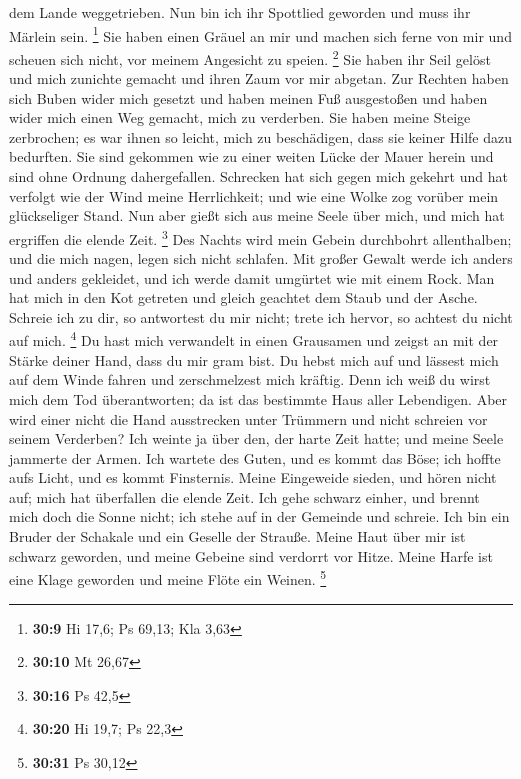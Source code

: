 dem Lande weggetrieben.  Nun bin ich ihr Spottlied
geworden und muss ihr Märlein sein. \footnote{\textbf{30:9} Hi 17,6; Ps
  69,13; Kla 3,63}  Sie haben einen Gräuel an mir und
machen sich ferne von mir und scheuen sich nicht, vor meinem Angesicht
zu speien. \footnote{\textbf{30:10} Mt 26,67}  Sie haben
ihr Seil gelöst und mich zunichte gemacht und ihren Zaum vor mir
abgetan.  Zur Rechten haben sich Buben wider mich gesetzt
und haben meinen Fuß ausgestoßen und haben wider mich einen Weg gemacht,
mich zu verderben.  Sie haben meine Steige zerbrochen; es
war ihnen so leicht, mich zu beschädigen, dass sie keiner Hilfe dazu
bedurften.  Sie sind gekommen wie zu einer weiten Lücke
der Mauer herein und sind ohne Ordnung dahergefallen. 
Schrecken hat sich gegen mich gekehrt und hat verfolgt wie der Wind
meine Herrlichkeit; und wie eine Wolke zog vorüber mein glückseliger
Stand.  Nun aber gießt sich aus meine Seele über mich,
und mich hat ergriffen die elende Zeit. \footnote{\textbf{30:16} Ps 42,5}
 Des Nachts wird mein Gebein durchbohrt allenthalben; und
die mich nagen, legen sich nicht schlafen.  Mit großer
Gewalt werde ich anders und anders gekleidet, und ich werde damit
umgürtet wie mit einem Rock.  Man hat mich in den Kot
getreten und gleich geachtet dem Staub und der Asche. 
Schreie ich zu dir, so antwortest du mir nicht; trete ich hervor, so
achtest du nicht auf mich. \footnote{\textbf{30:20} Hi 19,7; Ps 22,3}
 Du hast mich verwandelt in einen Grausamen und zeigst an
mit der Stärke deiner Hand, dass du mir gram bist.  Du
hebst mich auf und lässest mich auf dem Winde fahren und zerschmelzest
mich kräftig.  Denn ich weiß du wirst mich dem Tod
überantworten; da ist das bestimmte Haus aller Lebendigen.
 Aber wird einer nicht die Hand ausstrecken unter
Trümmern und nicht schreien vor seinem Verderben?  Ich
weinte ja über den, der harte Zeit hatte; und meine Seele jammerte der
Armen.  Ich wartete des Guten, und es kommt das Böse; ich
hoffte aufs Licht, und es kommt Finsternis.  Meine
Eingeweide sieden, und hören nicht auf; mich hat überfallen die elende
Zeit.  Ich gehe schwarz einher, und brennt mich doch die
Sonne nicht; ich stehe auf in der Gemeinde und schreie. 
Ich bin ein Bruder der Schakale und ein Geselle der Strauße.
 Meine Haut über mir ist schwarz geworden, und meine
Gebeine sind verdorrt vor Hitze.  Meine Harfe ist eine
Klage geworden und meine Flöte ein Weinen. \footnote{\textbf{30:31} Ps
  30,12}

